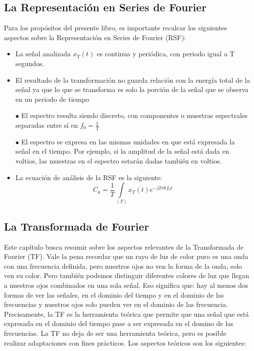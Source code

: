 \begin{itemize}
\end{itemize}


\subsection{ La Representación en Series de Fourier}

Para los propósitos del presente libro, es importante recalcar los siguientes aspectos sobre la Representación en Series de Fourier (RSF):\\

\begin{itemize}
	\item  La señal analizada $x_{T}(t)$ es continua y periódica, con periodo igual a T segundos.
    \item  El resultado de la transformación no guarda relación con la energía total de la señal ya que lo que se transforma es solo la porción de la señal que se observa en un periodo de tiempo
    \item[$\bullet$] El espectro resulta siendo discreto, con componentes o muestras espectrales separadas entre sí en $ f_0= \frac{1}{T} $
    \item[$\bullet$] El espectro se expresa en las mismas unidades en que está expresada la señal en el tiempo. Por ejemplo, si la amplitud de la señal está dada en voltios, las muestras en el espectro estarán dadas también en voltios. 
	\item  La ecuación de análisis de la RSF es la siguiente:
		\begin{equation} \label{equ_cinco}
			 C_{k} = \dfrac{1}{T} \int\limits_{(T)} x_T (t) e^{-j2 \pi k f_0 t}				
		\end{equation} 	
\end{itemize}



\subsection{La Transformada de Fourier}

Este capítulo busca resumir sobre los aspectos relevantes de la Transformada de Fourier (TF). Vale la pena recordar que un rayo de luz de color puro es una onda con una frecuencia definida, pero nuestros ojos no ven la forma de la onda, solo ven su color. Pero también podemos distinguir diferentes colores de luz que llegan a nuestros ojos combinados en una sola señal. Eso significa que: hay al menos dos formas de ver las señales, en el dominio del tiempo y en el dominio de las frecuencias y nuestros ojos solo pueden ver en el dominio de las frecuencia. Precisamente, la TF es la herramienta teórica que permite que una señal que está expresada en el dominio del tiempo pase a ser expresada en el domino de las frecuencias. La TF no deja de ser una herramienta teórica, pero es posible realizar adaptaciones con fines prácticos. Los aspectos teóricos son los siguientes:

